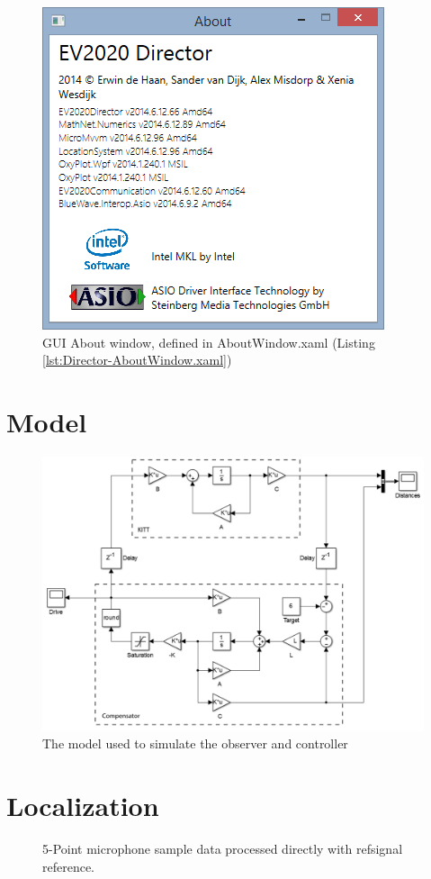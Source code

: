 \documentclass[final]{scrreprt} %
\begin{document}
\begin{appendices}
\begin{figure}[h]
\centering
	\includegraphics[width=0.5\linewidth]{resources/UI-About.png}
	\caption{GUI About window, defined in AboutWindow.xaml (Listing \ref{lst:Director-AboutWindow.xaml})}
	\label{fig:UI-About}
\end{figure}

\chapter{Model}
\label{app:model}
\begin{figure}[H]
	\centering    	
    	\includegraphics[width=\textwidth]{resources/model.png}
    	\caption{The model used to simulate the observer and controller}
    	\label{app:model}
\end{figure}

\chapter{Localization}
\label{app:localization}
\begin{figure}[H]
	\centering
	\setlength\figureheight{3cm}
    	\setlength{}
	
	\caption{5-Point microphone sample data processed directly with refsignal reference.}
	\label{fig:orgref}
\end{figure}


\end{appendices}
\end{document}

